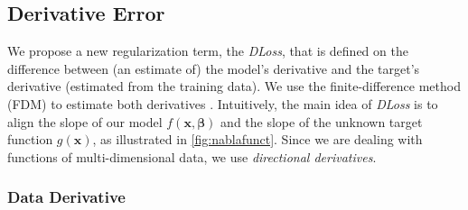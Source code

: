 \documentclass[conference]{IEEEtran}
\begin{document}

\subsection{Derivative Error}\label{subsec_regulmethod}

We propose a new regularization term, the \emph{DLoss}, that is defined on the difference between (an estimate of) the model's derivative and the target's derivative (estimated from the training data).
We use the finite-difference method (FDM) to estimate both derivatives \cite{paszynski2021deep,samaniego2020energy}. 
Intuitively, the main idea of \emph{DLoss} is to align the slope of our model $f(\mathbf{x},\boldsymbol{\beta})$ and the slope of the unknown target function $g(\mathbf{x})$, as illustrated in \autoref{fig:nablafunct}.
Since we are dealing with %
functions of multi-dimensional data, we use \emph{directional derivatives}.

\subsubsection{Data Derivative}
\end{document}
